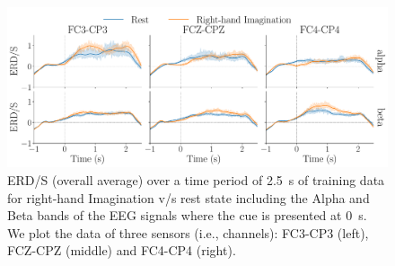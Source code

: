 \documentclass[letterpaper, 10pt, conference]{ieeeconf}      %
\begin{document}
\begin{figure}
\begin{center}
    \includegraphics[width=\columnwidth]{braincontrol/figures/eeg_pipeline/ERDS.pdf}
    \caption{ERD/S (overall average) over a time period of \SI{2.5}{s} of training data for right-hand Imagination v/s rest state including the Alpha and Beta bands of the EEG signals  where the cue is presented at \SI{0}{s}. We plot the data of three sensors (i.e., channels): FC3-CP3 (left), FCZ-CPZ (middle) and FC4-CP4 (right).}
    \label{fig:braincontrol:ERDS}
\end{center}
\end{figure}
\end{document}
